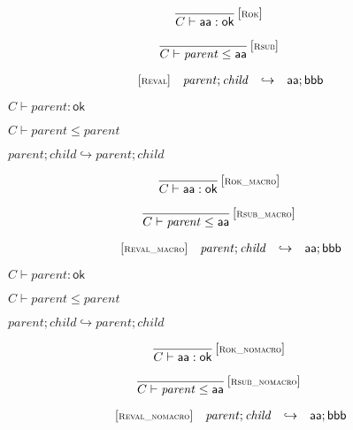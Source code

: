 $$
\begin{array}{@{}c@{}}\displaystyle
\frac{
}{
C \vdash \mathsf{aa} : \mathsf{ok}
} \, {[\textsc{\scriptsize Rok}]}
\qquad
\end{array}
$$

$$
\begin{array}{@{}c@{}}\displaystyle
\frac{
}{
C \vdash {\mathit{parent}} \leq \mathsf{aa}
} \, {[\textsc{\scriptsize Rsub}]}
\qquad
\end{array}
$$

$$
\begin{array}{@{}l@{}rcl@{}l@{}}
{[\textsc{\scriptsize Reval}]} \quad & {\mathit{parent}} ; {\mathit{child}} &\hookrightarrow& \mathsf{aa} ; \mathsf{bbb} \\
\end{array}
$$

$\boxed{C \vdash {\mathit{parent}} : \mathsf{ok}}$

$\boxed{C \vdash {\mathit{parent}} \leq {\mathit{parent}}}$

$\boxed{{\mathit{parent}} ; {\mathit{child}} \hookrightarrow {\mathit{parent}} ; {\mathit{child}}}$

$$
\begin{array}{@{}c@{}}\displaystyle
\frac{
}{
C \vdash \mathsf{aa} : \mathsf{ok}
} \, {[\textsc{\scriptsize Rok\_macro}]}
\qquad
\end{array}
$$

$$
\begin{array}{@{}c@{}}\displaystyle
\frac{
}{
C \vdash {\mathit{parent}} \leq \mathsf{aa}
} \, {[\textsc{\scriptsize Rsub\_macro}]}
\qquad
\end{array}
$$

$$
\begin{array}{@{}l@{}rcl@{}l@{}}
{[\textsc{\scriptsize Reval\_macro}]} \quad & {\mathit{parent}} ; {\mathit{child}} &\hookrightarrow& \mathsf{aa} ; \mathsf{bbb} \\
\end{array}
$$

$\boxed{C \vdash {\mathit{parent}} : \mathsf{ok}}$

$\boxed{C \vdash {\mathit{parent}} \leq {\mathit{parent}}}$

$\boxed{{\mathit{parent}} ; {\mathit{child}} \hookrightarrow {\mathit{parent}} ; {\mathit{child}}}$

$$
\begin{array}{@{}c@{}}\displaystyle
\frac{
}{
C \vdash \mathsf{aa} : \mathsf{ok}
} \, {[\textsc{\scriptsize Rok\_nomacro}]}
\qquad
\end{array}
$$

$$
\begin{array}{@{}c@{}}\displaystyle
\frac{
}{
C \vdash {\mathit{parent}} \leq \mathsf{aa}
} \, {[\textsc{\scriptsize Rsub\_nomacro}]}
\qquad
\end{array}
$$

$$
\begin{array}{@{}l@{}rcl@{}l@{}}
{[\textsc{\scriptsize Reval\_nomacro}]} \quad & {\mathit{parent}} ; {\mathit{child}} &\hookrightarrow& \mathsf{aa} ; \mathsf{bbb} \\
\end{array}
$$

